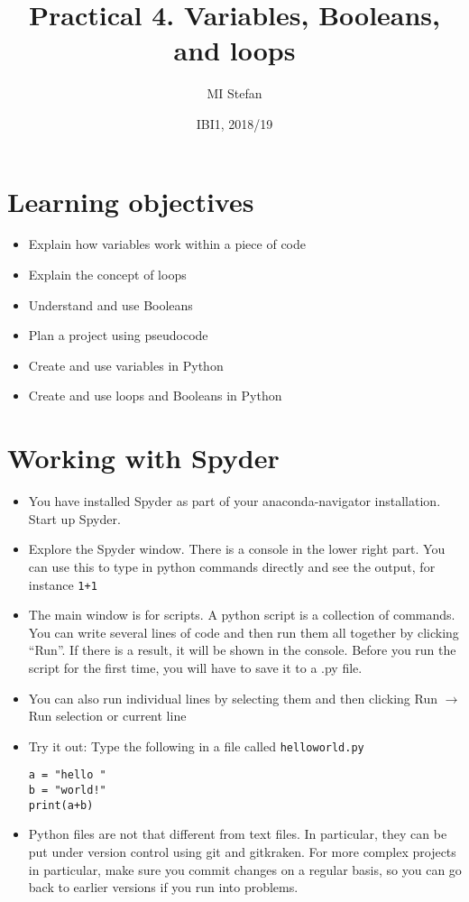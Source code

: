 \documentclass[pdflatex,a4paper]{article}
\title{Practical 4. Variables, Booleans, and loops}
\author{MI Stefan}
\date{IBI1, 2018/19}
\begin{document}
\newcommand{\<}{\textless}
\renewcommand{\>}{\textgreater}


\maketitle

\section{Learning objectives}

\begin{itemize}
\item
Explain how variables work within a piece of code
\item
Explain the concept of loops
\item
Understand and use Booleans
\item
Plan a project using pseudocode
\item
Create and use variables in Python 
\item
Create and use loops and Booleans in Python
\end{itemize}




\section{Working with Spyder}

\begin{itemize}
\item
You have installed Spyder as part of your anaconda-navigator installation. Start up Spyder.
\item
Explore the Spyder window. There is a console in the lower right part. You can use this to type in python commands directly and see the output, for instance \verb=1+1=
\item
The main window is for scripts. A python script is a collection of commands. You can write several lines of code and then run them all together by clicking ``Run''.  If there is a result, it will be shown in the console. Before you run the script for the first time, you will have to save it to a .py file.
\item
You can also run individual lines by selecting them and then clicking Run \(\rightarrow\) Run selection or current line
\item
Try it out: Type the following in a file called \verb=helloworld.py=
\begin{verbatim}
a = "hello "
b = "world!"
print(a+b)
\end{verbatim}
\item
Python files are not that different from text files. In particular, they can be put under version control using git and gitkraken. For more complex projects in particular, make sure you commit changes on a regular basis, so you can go back to earlier versions if you run into problems.
\end{itemize}
\end{document}
